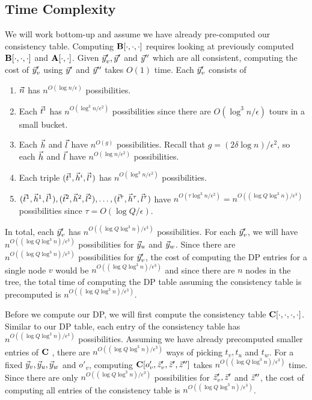 \documentclass[twoside,leqno]{article}
\newcommand{\eps}{\epsilon}
\begin{document}
\subsection{Time Complexity}
We will work bottom-up and assume we have already pre-computed our consistency table. Computing $\textbf{B}[\cdot, \cdot, \cdot]$ requires looking at previously computed $\textbf{B}[\cdot, \cdot, \cdot]$ and  $\textbf{A}[\cdot,\cdot]$. Given $\vec{y}_v', \vec{y}'$ and $\vec{y}''$ which are all consistent, computing the cost of $\vec{y}_v'$ using $\vec{y}'$ and $\vec{y}''$ takes $O(1)$ time. Each $\vec{y}_v'$ consists of
\begin{enumerate}
    \item $\vec{n}$ has $n^{O(\log n / \eps)}$ possibilities.
    \item Each $\vec{t}^i$ has $n^{O(\log^3 n /\eps^2)}$ possibilities since there are $O(\log^3 n /\eps)$ tours in a small bucket.
    \item Each $\vec{h}$ and $\vec{l}$ have $n^{O(g)}$ possibilities. Recall that $g = (2\delta \log n)/\eps^2 $, so each $\vec{h}$ and $\vec{l}$ have $n^{O(\log n /\eps^2)}$ possibilities.
    \item Each triple $(\vec{t}^i, \vec{h}^i, \vec{l}^i)$ has $n^{O(\log^3 n /\eps^2)}$ possibilities.
    \item $(\vec{t}^1, \vec{h}^1, \vec{l}^1), (\vec{t}^2, \vec{h}^2, \vec{l}^2), \ldots, (\vec{t}^\tau, \vec{h}^\tau, \vec{l}^\tau)$ have $n^{O(\tau \log^3 n /\eps^2)} = n^{O((\log Q\log^3 n)/\eps^3)}$ possibilities since $\tau = O(\log Q/\eps)$.
\end{enumerate}
In total, each $\vec{y}_v'$ has $n^{O((\log Q\log^3 n)/\eps^3)}$ possibilities. For each $\vec{y}_v'$, we will have $n^{O((\log Q\log^3 n)/\eps^3)}$ possibilities for $\vec{y}_u$ and $\vec{y}_w$. Since there are $n^{O((\log Q\log^3 n)/\eps^3)}$ possibilities for $\vec{y}_v'$, the cost of computing the DP entries for a single node $v$ would be $n^{O((\log Q\log^3 n)/\eps^3)}$ and since there are $n$ nodes in the tree, the total time of computing the DP table assuming the consistency table is precomputed is $n^{O((\log Q\log^3 n)/\eps^3)}$.

Before we compute our DP, we will first compute the consistency table $\textbf{C}[\cdot, \cdot, \cdot, \cdot]$. Similar to our DP table, each entry of the consistency table has $n^{O((\log Q\log^3 n)/\eps^3)}$ possibilities. Assuming we have already precomputed smaller entries of $\textbf{C}$ , there are $n^{O((\log Q\log^3 n)/\eps^3)}$ ways of picking $t_v, t_u$ and $t_w$. For a fixed $\vec{y}_v, \vec{y}_u, \vec{y}_w$ and $o'_v$, computing $\textbf{C}[o'_v, \vec{z}_v', \vec{z}', \vec{z}'']$ takes $n^{O((\log Q\log^3 n)/\eps^3)}$ time. Since there are only $n^{O((\log Q\log^3 n)/\eps^3)}$ possibilities for $\vec{z}_v', \vec{z}'$ and $\vec{z}''$, the cost of computing all entries of the consistency table is $n^{O((\log Q\log^3 n)/\eps^3)}$.
\end{document}

